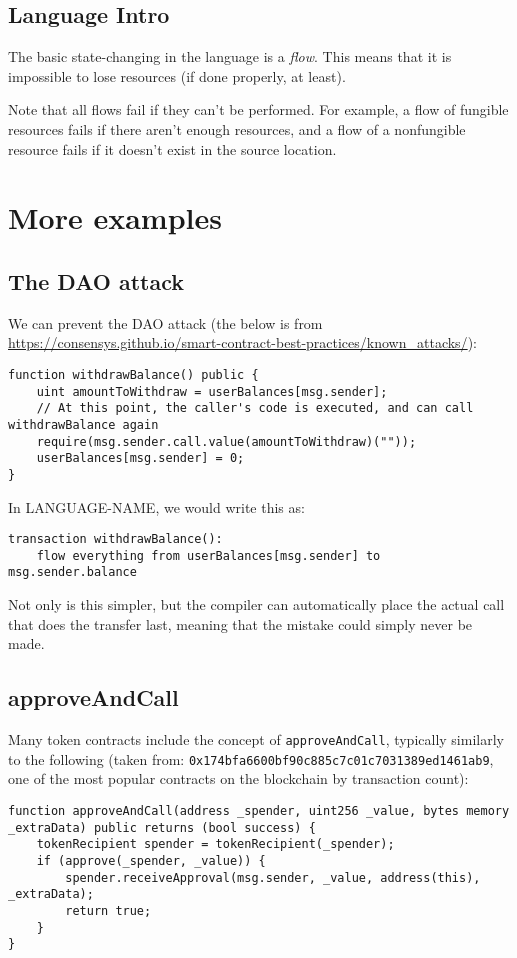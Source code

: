 \documentclass[10pt]{article}
\newcommand{\langName}{LANGUAGE-NAME\xspace}
\begin{document}
\subsection{Language Intro}

The basic state-changing in the language is a \emph{flow}.
This means that it is impossible to lose resources (if done properly, at least).

Note that all flows fail if they can't be performed.
For example, a flow of fungible resources fails if there aren't enough resources, and a flow of a nonfungible resource fails if it doesn't exist in the source location.

\section{More examples}

\subsection{The DAO attack}
We can prevent the DAO attack (the below is from \url{https://consensys.github.io/smart-contract-best-practices/known_attacks/}):
\begin{lstlisting}
function withdrawBalance() public {
    uint amountToWithdraw = userBalances[msg.sender];
    // At this point, the caller's code is executed, and can call withdrawBalance again
    require(msg.sender.call.value(amountToWithdraw)(""));
    userBalances[msg.sender] = 0;
}
\end{lstlisting}

In \langName, we would write this as:

\begin{lstlisting}
transaction withdrawBalance():
    flow everything from userBalances[msg.sender] to msg.sender.balance
\end{lstlisting}

Not only is this simpler, but the compiler can automatically place the actual call that does the transfer last, meaning that the mistake could simply never be made.

\subsection{approveAndCall}

Many token contracts include the concept of \lstinline{approveAndCall}, typically similarly to the following (taken from: \lstinline{0x174bfa6600bf90c885c7c01c7031389ed1461ab9}, one of the most popular contracts on the blockchain by transaction count):
\begin{lstlisting}
function approveAndCall(address _spender, uint256 _value, bytes memory _extraData) public returns (bool success) {
    tokenRecipient spender = tokenRecipient(_spender);
    if (approve(_spender, _value)) {
        spender.receiveApproval(msg.sender, _value, address(this), _extraData);
        return true;
    }
}
\end{lstlisting}
\end{document}
